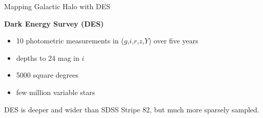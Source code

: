 \documentclass[12pt]{beamer}
\begin{document}


\begin{frame}{Mapping Galactic Halo with DES}

\textbf{Dark Energy Survey (DES)}
\begin{itemize}
\item 10 photometric measurements in ($g$,$i$,$r$,$z$,$Y$) over five years
\item depths to 24 mag in $i$
\item 5000 square degrees
\item few million variable stars
\end{itemize}

\vspace{.3in}

\begin{center}
DES is deeper and wider than SDSS Stripe 82, but much more sparsely sampled.
\end{center}

\end{frame}





\end{document}
